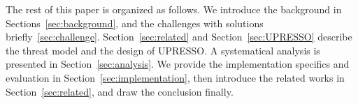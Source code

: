 The rest of this paper is organized as follows. We introduce the background in Sections~\ref{sec:background}, and the challenges with solutions briefly~\ref{sec:challenge}. Section~\ref{sec:related} and Section~\ref{sec:UPRESSO} describe the threat model and the design of UPRESSO. A systematical analysis is presented in Section~\ref{sec:analysis}. We provide the implementation specifics and evaluation in Section~\ref{sec:implementation}, then introduce the related works in Section~\ref{sec:related}, and draw the conclusion finally.


